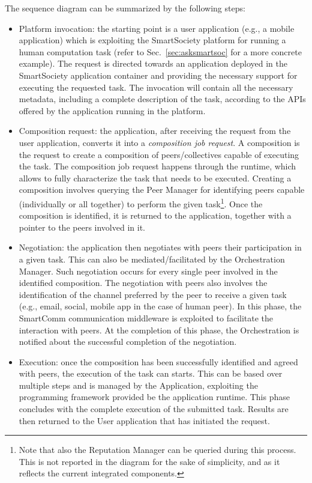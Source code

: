 The sequence diagram can be summarized by the following steps:
\begin{itemize}
\item Platform invocation: the starting point is a user application (e.g., a mobile application) which is exploiting the SmartSociety platform for running a human computation task (refer to Sec.~\ref{sec:asksmartsoc} for a more concrete example). The request is directed towards an application deployed in the SmartSociety application container and providing the necessary support for executing the requested task. The invocation will contain all the necessary metadata, including a complete description of the task, according to the APIs offered by the application running in the platform.

\item Composition request: the application, after receiving the request from the user application, converts it into a \textit{composition job request}. A composition is the request to create a composition of peers/collectives capable of executing the task. The composition job request happens through %
the runtime, which allows to fully characterize the task that needs to be executed. Creating a composition involves querying the Peer Manager for identifying peers capable (individually or all together) to perform the given task\footnote{Note that also the Reputation Manager can be queried during this process. This is not reported in the diagram for the sake of simplicity, and as it reflects the current integrated components.}. Once the composition is identified, it is returned to the application, together with a pointer to the peers involved in it.

\item  Negotiation: the application then negotiates with peers their participation in a given task. This can also be mediated/facilitated by the Orchestration Manager. Such negotiation occurs for every single peer involved in the identified composition. The negotiation with peers also involves the identification of the channel preferred by the peer to receive a given task (e.g., email, social, mobile app in the case of human peer). In this phase, the SmartComm communication middleware is exploited to facilitate the interaction with peers. At the completion of this phase, the Orchestration is notified about the successful completion of the negotiation.

\item Execution: once the composition has been successfully identified and agreed with peers, the execution of the task can starts. This can be based over multiple steps and is managed by the Application, exploiting the programming framework provided be the application runtime. This phase concludes with the complete execution of the submitted task. Results are then returned to the User application that has initiated the request.

\end{itemize}


